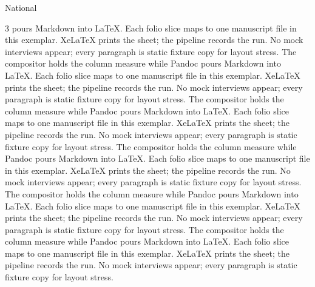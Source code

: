 \documentclass[
  ignorenonframetext,
]{beamer}
\begin{document}
\begin{frame}{National}
\begin{multicols}{3}
pours Markdown into LaTeX. Each folio slice maps to one manuscript file
in this exemplar. XeLaTeX prints the sheet; the pipeline records the
run. No mock interviews appear; every paragraph is static fixture copy
for layout stress. The compositor holds the column measure while Pandoc
pours Markdown into LaTeX. Each folio slice maps to one manuscript file
in this exemplar. XeLaTeX prints the sheet; the pipeline records the
run. No mock interviews appear; every paragraph is static fixture copy
for layout stress. The compositor holds the column measure while Pandoc
pours Markdown into LaTeX. Each folio slice maps to one manuscript file
in this exemplar. XeLaTeX prints the sheet; the pipeline records the
run. No mock interviews appear; every paragraph is static fixture copy
for layout stress. The compositor holds the column measure while Pandoc
pours Markdown into LaTeX. Each folio slice maps to one manuscript file
in this exemplar. XeLaTeX prints the sheet; the pipeline records the
run. No mock interviews appear; every paragraph is static fixture copy
for layout stress. The compositor holds the column measure while Pandoc
pours Markdown into LaTeX. Each folio slice maps to one manuscript file
in this exemplar. XeLaTeX prints the sheet; the pipeline records the
run. No mock interviews appear; every paragraph is static fixture copy
for layout stress. The compositor holds the column measure while Pandoc
pours Markdown into LaTeX. Each folio slice maps to one manuscript file
in this exemplar. XeLaTeX prints the sheet; the pipeline records the
run. No mock interviews appear; every paragraph is static fixture copy
for layout stress.

\end{multicols}
\end{frame}
\end{document}

